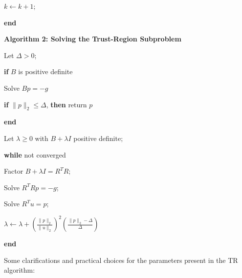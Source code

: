 \documentclass[11pt]{article}
\begin{document}
\vspace{-.15cm}

\quad \qquad $k \leftarrow k+1$;

\vspace{-.15cm}


\quad \textbf{end}

\bigskip


\textbf{Algorithm 2: Solving the Trust-Region Subproblem}

\quad Let $\Delta > 0$;

\vspace{-.15cm}

\quad \textbf{if} $B$ is positive definite

\vspace{-.15cm}

\quad \qquad Solve $Bp  = -g$

\vspace{-.15cm}

\quad \qquad \textbf{if} $\| p \|_2 \le \Delta$, \textbf{then} return $p$

\vspace{-.15cm}

\quad \textbf{end}

\vspace{-.15cm}

\quad Let $\lambda \ge 0$ with $B + \lambda I$ positive definite;

\vspace{-.15cm}

\quad \textbf{while} not converged

\vspace{-.15cm}

\quad \qquad Factor $B+ \lambda I = R^TR$; \quad {}

\vspace{-.15cm}

\quad \qquad Solve $R^TR p = -g$;  %

\vspace{-.15cm}

\quad \qquad Solve $R^Tu = p$;

\vspace{-.15cm}

\quad \qquad $\lambda \leftarrow \lambda +\left ( \frac{\| p \|_2}{\| u \|_2}
 	\right )^2
	\left ( 
	\frac{\| p \|_2 - \Delta}{\Delta}
	\right )
$

\quad \textbf{end}

\bigskip
Some clarifications and practical choices for the parameters present
in the TR algorithm:
\end{document}
